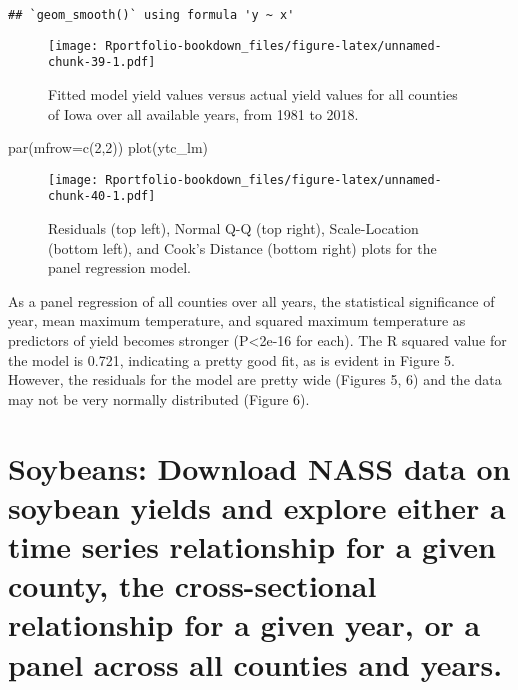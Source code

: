 \documentclass[
]{book}
\newenvironment{Shaded}{\begin{snugshade}}{\end{snugshade}}
\newcommand{\AttributeTok}[1]{\textcolor[rgb]{0.77,0.63,0.00}{#1}}
\newcommand{\DecValTok}[1]{\textcolor[rgb]{0.00,0.00,0.81}{#1}}
\newcommand{\FunctionTok}[1]{\textcolor[rgb]{0.00,0.00,0.00}{#1}}
\newcommand{\NormalTok}[1]{#1}
\begin{document}
\begin{verbatim}
## `geom_smooth()` using formula 'y ~ x'
\end{verbatim}

\begin{figure}
\centering
\texttt{[image: Rportfolio-bookdown\_files/figure-latex/unnamed-chunk-39-1.pdf]}
\caption{\label{fig:unnamed-chunk-39}Fitted model yield values versus actual yield values for all counties of Iowa over all available years, from 1981 to 2018.}
\end{figure}

\begin{Shaded}
\begin{Highlighting}[]
\FunctionTok{par}\NormalTok{(}\AttributeTok{mfrow=}\FunctionTok{c}\NormalTok{(}\DecValTok{2}\NormalTok{,}\DecValTok{2}\NormalTok{))}
\FunctionTok{plot}\NormalTok{(ytc\_lm)}
\end{Highlighting}
\end{Shaded}

\begin{figure}
\centering
\texttt{[image: Rportfolio-bookdown\_files/figure-latex/unnamed-chunk-40-1.pdf]}
\caption{\label{fig:unnamed-chunk-40}Residuals (top left), Normal Q-Q (top right), Scale-Location (bottom left), and Cook's Distance (bottom right) plots for the panel regression model.}
\end{figure}

As a panel regression of all counties over all years, the statistical significance of year, mean maximum temperature, and squared maximum temperature as predictors of yield becomes stronger (P\textless2e-16 for each). The R squared value for the model is 0.721, indicating a pretty good fit, as is evident in Figure 5. However, the residuals for the model are pretty wide (Figures 5, 6) and the data may not be very normally distributed (Figure 6).

\hypertarget{soybeans-download-nass-data-on-soybean-yields-and-explore-either-a-time-series-relationship-for-a-given-county-the-cross-sectional-relationship-for-a-given-year-or-a-panel-across-all-counties-and-years.}{%
\section{Soybeans: Download NASS data on soybean yields and explore either a time series relationship for a given county, the cross-sectional relationship for a given year, or a panel across all counties and years.}\label{soybeans-download-nass-data-on-soybean-yields-and-explore-either-a-time-series-relationship-for-a-given-county-the-cross-sectional-relationship-for-a-given-year-or-a-panel-across-all-counties-and-years.}}
\end{document}
